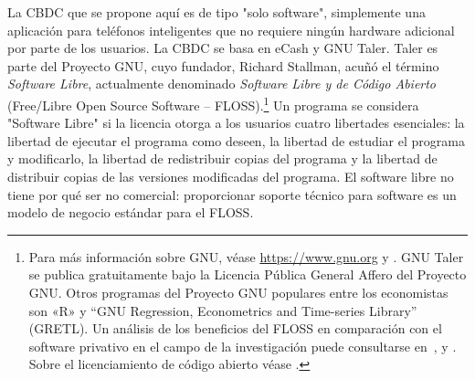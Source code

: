 \documentclass[10pt,spanish]{article}
\begin{document}
La CBDC que se propone aquí es de tipo "solo software", simplemente una
aplicación para teléfonos inteligentes que no requiere ningún hardware
adicional por parte de los usuarios. La CBDC se basa en eCash y GNU
Taler. Taler es parte del Proyecto GNU, cuyo fundador, Richard Stallman, acuñó
el término \emph{Software Libre}, actualmente denominado \emph{Software Libre
y de Código Abierto} (Free/Libre Open Source Software -- FLOSS).\footnote{Para
más información sobre GNU, véase \url{https://www.gnu.org} y
\citet{Stallman}. GNU Taler se publica gratuitamente bajo la Licencia Pública
General Affero del Proyecto GNU. Otros programas del Proyecto GNU populares
entre los economistas son «R» y ``GNU Regression, Econometrics and Time-series
Library'' (GRETL). Un análisis de los beneficios del FLOSS en comparación con
el software privativo en el campo de la investigación puede consultarse
en~\citet{Baiocchi}, \citet{Yalta2008} y \citet{Yalta2010}. Sobre el
licenciamiento de código abierto véase \citet{Lerner}.} Un programa se
considera "Software Libre" si la licencia otorga a los usuarios cuatro
libertades esenciales: la libertad de ejecutar el programa como deseen, la
libertad de estudiar el programa y modificarlo, la libertad de redistribuir
copias del programa y la libertad de distribuir copias de las versiones
modificadas del programa.  El software libre no tiene por qué ser no
comercial: proporcionar soporte técnico para software es un modelo de negocio
estándar para el FLOSS.
\end{document}
